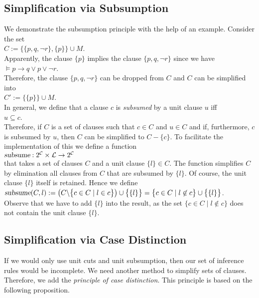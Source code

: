 \subsection{Simplification via Subsumption}
We demonstrate the subsumption principle with the help of an example.  Consider
the set
 \\[0.2cm]
\hspace*{1.3cm} 
$C := \bigl\{ \{p, q, \neg r\}, \{p\} \bigr\} \cup M$. 
\\[0.2cm]
Apparently, the clause  $\{p\}$ implies the clause $\{p, q, \neg r\}$ since we have \\[0.2cm]
\hspace*{1.3cm} 
$\models p \rightarrow q \vee p \vee \neg r$. 
\\[0.2cm]
Therefore, the clause $\{p, q, \neg r\}$ can be dropped from $C$ and $C$ can be simplified into
\\[0.2cm]
\hspace*{1.3cm}
$C' := \bigl\{ \{p\} \bigr\} \cup M$. 
\\[0.2cm]
In general, we define that a clause $c$
is \emph{subsumed} by a unit clause  $u$ iff
\\[0.2cm]
\hspace*{1.3cm}
$u \subseteq c$.
\\[0.2cm]
Therefore, if  $C$ is a set of clauses such that  $c \in C$ and $u \in C$ and if, furthermore,
$c$ is subsumed by $u$, then  $C$ can be simplified to  $C - \{c\}$.
To facilitate the implementation of this we define a function
\\[0.2cm]
\hspace*{1.3cm}
$\textsl{subsume}: 2^\mathcal{C} \times \mathcal{L} \rightarrow 2^\mathcal{C}$
\\[0.2cm]
that takes a set of clauses $C$ and a unit clause $\{l\} \in C$.  The function simplifies $C$ by
elimination all clauses from $C$ that are subsumed by  $\{l\}$.  Of course, the unit clause
$\{l\}$ itself is retained.  Hence we define
\\[0.2cm]
\hspace*{1.3cm}
$\textsl{subsume}(C, l) := 
\bigl(C \backslash \bigl\{ c \in C \mid l \in c \bigr\}\bigr) \cup \bigl\{\{l\}\bigr\} = 
\bigl\{ c \in C \mid l \not\in c \bigr\} \cup \bigl\{\{l\}\bigr\}$.
\\[0.2cm]
Observe that we have to add $\{l\}$ into the result, as the set 
$\bigl\{ c \in C \mid l \not\in c \bigr\}$ does not contain the unit clause $\{l\}$.


\subsection{Simplification via Case Distinction}
If we would only use unit cuts and unit subsumption, then our set of inference rules would be
incomplete.  We need another method to simplify sets of clauses.
Therefore, we add the \emph{principle of case distinction}.
This principle is based on the following proposition.

